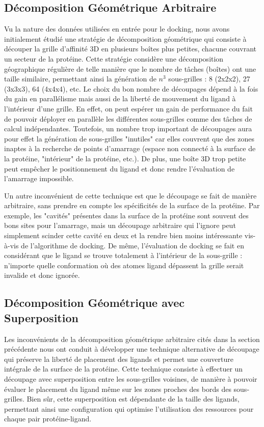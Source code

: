 \subsection{Décomposition Géométrique Arbitraire}
Vu la nature des données utilisées en entrée pour le docking, nous avons initialement étudié une stratégie de décomposition géométrique qui consiste à découper la grille d'affinité 3D en plusieurs boîtes plus petites, chacune couvrant un secteur de la protéine. Cette stratégie considère une décomposition géographique régulière de telle manière que le nombre de tâches (boîtes) ont une taille similaire, permettant ainsi la génération de $n^3$ sous-grilles : 8 (2x2x2), 27 (3x3x3), 64 (4x4x4), etc. Le choix du bon nombre de découpages dépend à la fois du gain  en parallélisme mais aussi de la liberté de mouvement du ligand à l'intérieur d'une grille. 
En effet, on peut espérer un gain de performance du fait de pouvoir déployer en parallèle les différentes sous-grilles comme des tâches de calcul indépendantes. Toutefois, un nombre trop important de découpages aura pour effet la génération de sous-grilles "inutiles" car elles couvrent que des zones inaptes à la recherche de points d'amarrage (espace non connecté à la surface de la protéine, "intérieur" de la protéine, etc.). De plus, une boîte 3D trop petite peut empêcher le positionnement du ligand et donc rendre l'évaluation de l'amarrage impossible.

Un autre inconvénient de cette technique est que le découpage se fait de manière arbitraire, sans prendre en compte les spécificités de la surface de la protéine. Par exemple, les "cavités" présentes dans la surface de la protéine sont souvent des bons sites pour l'amarrage, mais un découpage arbitraire qui l'ignore peut simplement scinder cette cavité en deux et la rendre bien moins intéressante vis-à-vis de l'algorithme de docking. De même, l'évaluation de docking se fait en considérant que le ligand se trouve totalement à l'intérieur de la sous-grille : n'importe quelle conformation où des atomes ligand dépassent la grille serait invalide et donc ignorée. 

\subsection{Décomposition Géométrique avec Superposition}
Les inconvénients de la décomposition géométrique arbitraire cités dans la section précédente nous ont conduit à développer une technique alternative de découpage qui préserve la liberté de placement des ligands et permet une couverture intégrale de la surface de la protéine. Cette technique consiste à effectuer un découpage avec superposition entre les sous-grilles voisines, de manière à pouvoir évaluer le placement du ligand même sur les zones proches des bords des sous-grilles. Bien sûr, cette superposition est dépendante de la taille des ligands, permettant ainsi une configuration qui optimise l'utilisation des ressources pour chaque pair protéine-ligand. 

